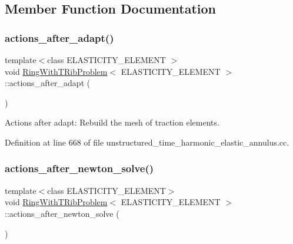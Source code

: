 \subsection{Member Function Documentation}
\mbox{\label{classRingWithTRibProblem_a8749aaf1e46d802c210b51e07093505b}} 
\subsubsection{\texorpdfstring{actions\+\_\+after\+\_\+adapt()}{actions\_after\_adapt()}}
{\footnotesize\ttfamily template$<$class E\+L\+A\+S\+T\+I\+C\+I\+T\+Y\+\_\+\+E\+L\+E\+M\+E\+NT $>$ \\
void \hyperlink{classRingWithTRibProblem}{Ring\+With\+T\+Rib\+Problem}$<$ E\+L\+A\+S\+T\+I\+C\+I\+T\+Y\+\_\+\+E\+L\+E\+M\+E\+NT $>$\+::actions\+\_\+after\+\_\+adapt (\begin{DoxyParamCaption}{ }\end{DoxyParamCaption})}



Actions after adapt\+: Rebuild the mesh of traction elements. 



Definition at line 668 of file unstructured\+\_\+time\+\_\+harmonic\+\_\+elastic\+\_\+annulus.\+cc.

\mbox{\label{classRingWithTRibProblem_a5d9f7b05cc71c02275f6c3c1a465fd20}} 
\subsubsection{\texorpdfstring{actions\+\_\+after\+\_\+newton\+\_\+solve()}{actions\_after\_newton\_solve()}}
{\footnotesize\ttfamily template$<$class E\+L\+A\+S\+T\+I\+C\+I\+T\+Y\+\_\+\+E\+L\+E\+M\+E\+NT$>$ \\
void \hyperlink{classRingWithTRibProblem}{Ring\+With\+T\+Rib\+Problem}$<$ E\+L\+A\+S\+T\+I\+C\+I\+T\+Y\+\_\+\+E\+L\+E\+M\+E\+NT $>$\+::actions\+\_\+after\+\_\+newton\+\_\+solve (\begin{DoxyParamCaption}{ }\end{DoxyParamCaption})\hspace{0.3cm}{\ttfamily [inline]}}



